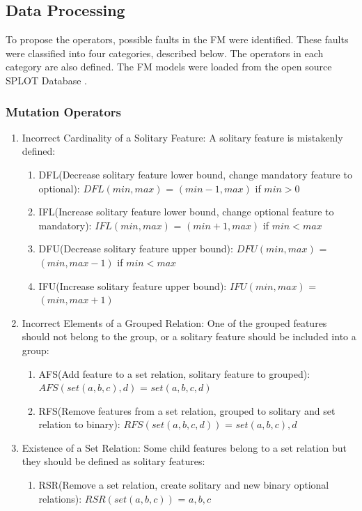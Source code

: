 \documentclass[a4paper,12pt]{article}
\begin{document}
\subsection{Data Processing}
To propose the operators, possible faults in the FM were identified\cite{7102591}. These faults were classified into four categories, described below. The operators in each category are also defined. The FM models were loaded from the open source SPLOT Database \cite{splot}.
\subsubsection{Mutation Operators}
\begin{enumerate}
    \item Incorrect Cardinality of a Solitary Feature: A solitary feature is mistakenly defined:
    \begin{enumerate}
        \item DFL(Decrease solitary feature lower bound, change mandatory feature to optional): $DFL(min, max)$ = $(min - 1, max)$ if $min > 0$
        \item IFL(Increase solitary feature lower bound, change optional feature to mandatory): $IFL(min, max)$ = $(min + 1, max)$ if $min < max$
        \item DFU(Decrease solitary feature upper bound): $DFU(min, max)$ = $(min, max - 1)$ if $min < max$
        \item IFU(Increase solitary feature upper bound): $IFU(min, max)$ = $(min, max + 1)$
    \end{enumerate}
    \item Incorrect Elements of a Grouped Relation: One of the grouped features should not belong to the group, or a solitary feature should be included into a group:
    \begin{enumerate}
        \item AFS(Add feature to a set relation, solitary feature to grouped): $AFS(set(a, b, c), d)$ = $set(a, b, c, d)$
        \item RFS(Remove features from a set relation, grouped to solitary and set relation to binary): $RFS(set(a, b, c, d))$ = $set(a, b, c), d$
    \end{enumerate}
    \item Existence of a Set Relation: Some child features belong to a set relation but they should be defined as solitary features:
    \begin{enumerate}
        \item RSR(Remove a set relation, create solitary and new binary optional relations): $RSR(set(a, b, c))$ = $a, b, c$

\end{enumerate}
\end{enumerate}
\end{document}
